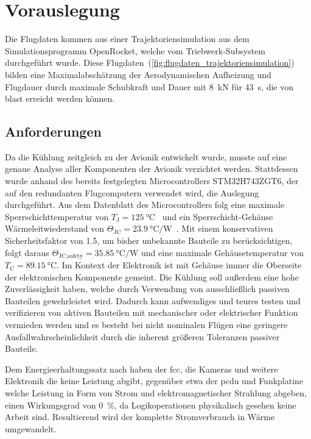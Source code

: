\chapter{Vorauslegung}
\label{chap:Vorauslegung}
Die Flugdaten kommen aus einer Trajektoriensimulation aus dem Simulationsprogramm OpenRocket, welche vom Triebwerk-Subsystem durchgeführt wurde.
Diese Flugdaten~(\ref{fig:flugdaten_trajektoriensimulation}) bilden eine Maximalabschätzung der Aerodynamischen Aufheizung und Flugdauer durch
maximale Schubkraft und Dauer mit \SI{8}{\kilo\newton} für \SI{43}{\second}, die von \ac{blast} erreicht werden können.

\section{Anforderungen}

Da die Kühlung zeitgleich zu der Avionik entwickelt wurde, musste auf eine genaue Analyse aller Komponenten der Avionik verzichtet werden.
Stattdessen wurde anhand des bereits festgelegten Microcontrollers STM32H743ZGT6, der auf den redundanten Flugcomputern verwendet wird,
die Auslegung durchgeführt.
Aus dem Datenblatt des Microcontrollers folg eine maximale Sperrschichttemperatur von $T_\text{J} = \SI{125}{\degreeCelsius}$~\cite{STM32}
und ein Sperrschicht-Gehäuse Wärmeleitwiederstand von $\Theta_\text{JC} = \SI{23.9}{\degreeCelsius\per\watt}$~\cite{STM32}. Mit einem konservativen
Sicherheitsfaktor von 1.5, um bisher unbekannte Bauteile zu berücksichtigen, folgt daraus $\Theta_\text{JC,safety} = \SI{35.85}{\degreeCelsius\per\watt}$
und eine maximale Gehäusetemperatur von $T_\text{C} = \SI{89.15}{\degreeCelsius}$. Im Kontext der Elektronik ist mit Gehäuse immer die
Oberseite der elektronischen Komponente gemeint.
Die Kühlung soll außerdem eine hohe Zuverlässigkeit haben, welche durch Verwendung von ausschließlich passiven Bauteilen gewehrleistet wird.
Dadurch kann aufwendiges und teures testen und verifizieren von aktiven Bauteilen mit mechanischer oder elektrischer Funktion vermieden werden und es besteht bei
nicht nominalen Flügen eine geringere Ausfallwahrscheinlichkeit durch die inherent größeren Toleranzen passiver Bauteile.

Dem Energieerhaltungssatz nach haben der \ac{fcc}, die Kameras und weitere Elektronik die keine Leistung abgibt, gegenüber etwa
der \ac{pcdu} und Funkplatine welche Leistung in Form von Strom und elektromagnetischer Strahlung abgeben, einen Wirkungsgrad von
\SI{0}{\percent}, da Logikoperationen physikalisch gesehen keine Arbeit sind. Resultierend wird der komplette Stromverbrauch
in Wärme umgewandelt.

